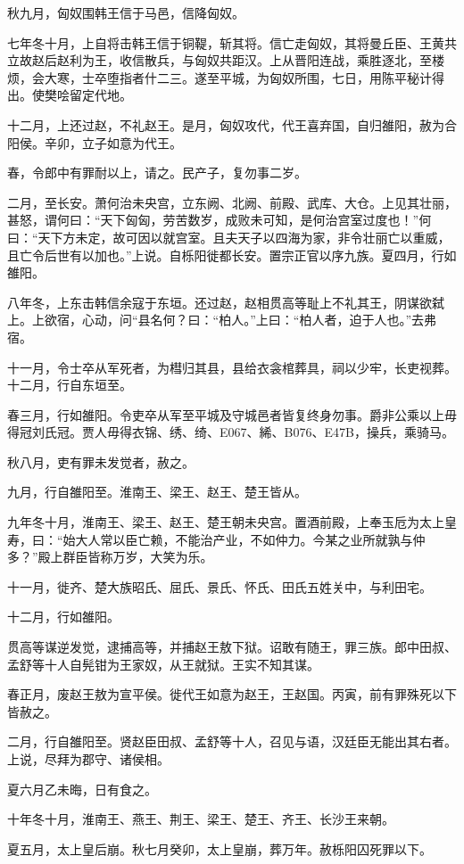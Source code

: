 \documentclass[]{article}
\begin{document}
秋九月，匈奴围韩王信于马邑，信降匈奴。

七年冬十月，上自将击韩王信于铜鞮，斩其将。信亡走匈奴，其将曼丘臣、王黄共立故赵后赵利为王，收信散兵，与匈奴共距汉。上从晋阳连战，乘胜逐北，至楼烦，会大寒，士卒堕指者什二三。遂至平城，为匈奴所围，七日，用陈平秘计得出。使樊哙留定代地。

十二月，上还过赵，不礼赵王。是月，匈奴攻代，代王喜弃国，自归雒阳，赦为合阳侯。辛卯，立子如意为代王。

春，令郎中有罪耐以上，请之。民产子，复勿事二岁。

二月，至长安。萧何治未央宫，立东阙、北阙、前殿、武库、大仓。上见其壮丽，甚怒，谓何曰：``天下匈匈，劳苦数岁，成败未可知，是何治宫室过度也！''何曰：``天下方未定，故可因以就宫室。且夫天子以四海为家，非令壮丽亡以重威，且亡令后世有以加也。''上说。自栎阳徙都长安。置宗正官以序九族。夏四月，行如雒阳。

八年冬，上东击韩信余寇于东垣。还过赵，赵相贯高等耻上不礼其王，阴谋欲弑上。上欲宿，心动，问``县名何？曰：``柏人。''上曰：``柏人者，迫于人也。''去弗宿。

十一月，令士卒从军死者，为槥归其县，县给衣衾棺葬具，祠以少牢，长吏视葬。十二月，行自东垣至。

春三月，行如雒阳。令吏卒从军至平城及守城邑者皆复终身勿事。爵非公乘以上毋得冠刘氏冠。贾人毋得衣锦、绣、绮、E067、絺、B076、E47B，操兵，乘骑马。

秋八月，吏有罪未发觉者，赦之。

九月，行自雒阳至。淮南王、梁王、赵王、楚王皆从。

九年冬十月，淮南王、梁王、赵王、楚王朝未央宫。置酒前殿，上奉玉卮为太上皇寿，曰：``始大人常以臣亡赖，不能治产业，不如仲力。今某之业所就孰与仲多？''殿上群臣皆称万岁，大笑为乐。

十一月，徙齐、楚大族昭氏、屈氏、景氏、怀氏、田氏五姓关中，与利田宅。

十二月，行如雒阳。

贯高等谋逆发觉，逮捕高等，并捕赵王敖下狱。诏敢有随王，罪三族。郎中田叔、孟舒等十人自髡钳为王家奴，从王就狱。王实不知其谋。

春正月，废赵王敖为宣平侯。徙代王如意为赵王，王赵国。丙寅，前有罪殊死以下皆赦之。

二月，行自雒阳至。贤赵臣田叔、孟舒等十人，召见与语，汉廷臣无能出其右者。上说，尽拜为郡守、诸侯相。

夏六月乙未晦，日有食之。

十年冬十月，淮南王、燕王、荆王、梁王、楚王、齐王、长沙王来朝。

夏五月，太上皇后崩。秋七月癸卯，太上皇崩，葬万年。赦栎阳囚死罪以下。
\end{document}
